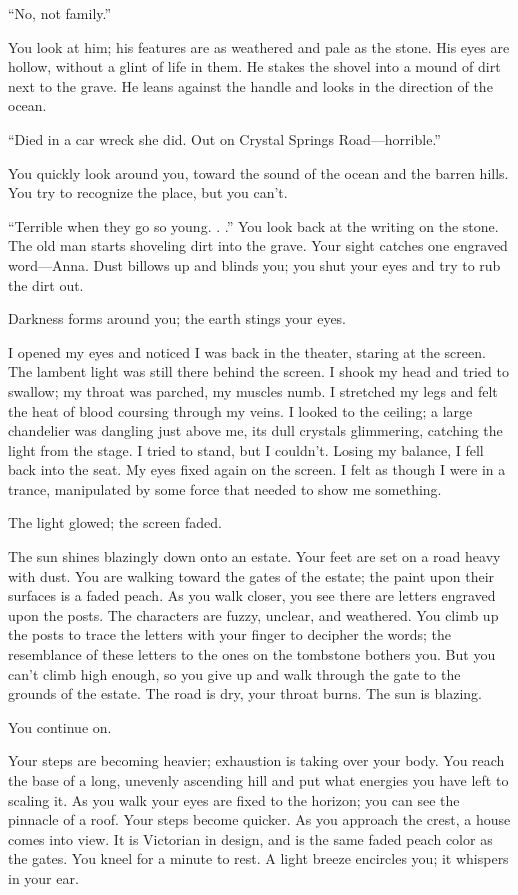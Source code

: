 ``No, not family.''

You look at him; his features are as weathered and pale as the stone.
His eyes are hollow, without a glint of life in them. He stakes the
shovel into a mound of dirt next to the grave. He leans against the
handle and looks in the direction of the ocean.

``Died in a car wreck she did. Out on Crystal Springs Road---horrible.''

You quickly look around you, toward the sound of the ocean and the
barren hills. You try to recognize the place, but you can't.

``Terrible when they go so young. . .'' You look back at the writing on
the stone. The old man starts shoveling dirt into the grave. Your sight
catches one engraved word---Anna. Dust billows up and blinds you; you
shut your eyes and try to rub the dirt out.

Darkness forms around you; the earth stings your eyes.

I opened my eyes and noticed I was back in the theater, staring at the
screen. The lambent light was still there behind the screen. I shook my
head and tried to swallow; my throat was parched, my muscles numb. I
stretched my legs and felt the heat of blood coursing through my veins.
I looked to the ceiling; a large chandelier was dangling just above me,
its dull crystals glimmering, catching the light from the stage. I tried
to stand, but I couldn't. Losing my balance, I fell back into the seat.
My eyes fixed again on the screen. I felt as though I were in a trance,
manipulated by some force that needed to show me something.

The light glowed; the screen faded.

The sun shines blazingly down onto an estate. Your feet are set on a
road heavy with dust. You are walking toward the gates of the estate;
the paint upon their surfaces is a faded peach. As you walk closer, you
see there are letters engraved upon the posts. The characters are fuzzy,
unclear, and weathered. You climb up the posts to trace the letters with
your finger to decipher the words; the resemblance of these letters to
the ones on the tombstone bothers you. But you can't climb high enough,
so you give up and walk through the gate to the grounds of the estate.
The road is dry, your throat burns. The sun is blazing.

You continue on.

Your steps are becoming heavier; exhaustion is taking over your body.
You reach the base of a long, unevenly ascending hill and put what
energies you have left to scaling it. As you walk your eyes are fixed to
the horizon; you can see the pinnacle of a roof. Your steps become
quicker. As you approach the crest, a house comes into view. It is
Victorian in design, and is the same faded peach color as the gates. You
kneel for a minute to rest. A light breeze encircles you; it whispers in
your ear.

